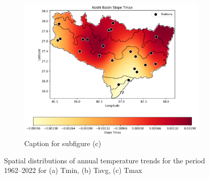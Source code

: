 \begin{figure}[htbp]
  \vspace{0.5cm} %
  
  \begin{subfigure}{0.45\textwidth}
      \centering
      \includegraphics[width=\linewidth]{images/avg_krig_Koshi Basin Slope Tmax.png}
      \caption{Caption for subfigure (c)}
      \label{fig:7c}
  \end{subfigure}
  
  \caption{Spatial distributions of annual temperature trends for the period 1962–2022 for (a) Tmin, (b) Tavg, (c) Tmax}
  \label{fig:krig_results}
\end{figure}


